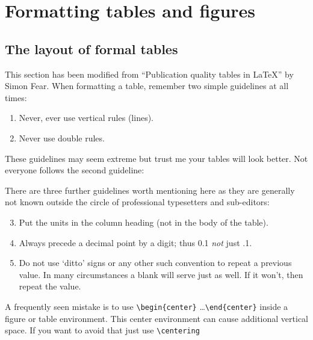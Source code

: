 \chapter{Formatting tables and figures}

\ifpdf
    \graphicspath{{Chapter3/Figs/Raster/}{Chapter3/Figs/PDF/}{Chapter3/Figs/}}
\else
    \graphicspath{{Chapter3/Figs/Vector/}{Chapter3/Figs/}}
\fi

\section{The layout of formal tables}
This section has been modified from ``Publication quality tables in \LaTeX*''
by Simon Fear. When formatting a table, remember two simple guidelines at 
all times:

\begin{enumerate}
  \item Never, ever use vertical rules (lines).
  \item Never use double rules.
\end{enumerate}

These guidelines may seem extreme but trust me your tables will look better. 
Not everyone follows the second guideline:

There are three further guidelines worth mentioning here as they
are generally not known outside the circle of professional
typesetters and sub-editors:

\begin{enumerate}\setcounter{enumi}{2}
  \item Put the units in the column heading (not in the body of
          the table).
  \item Always precede a decimal point by a digit; thus 0.1
      {\em not} just .1.
  \item Do not use `ditto' signs or any other such convention to
      repeat a previous value. In many circumstances a blank
      will serve just as well. If it won't, then repeat the value.
\end{enumerate}

A frequently seen mistake is to use \verb+\begin{center}+ \dots \verb+\end{center}+ inside a figure or table environment. This center environment can cause additional vertical space. If you want to avoid that just use \verb+\centering+


